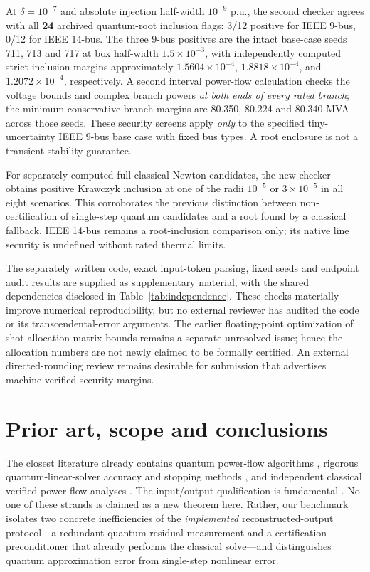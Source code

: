\documentclass[11pt,a4paper]{article}
\theoremstyle{remark}\newtheorem{remark}[theorem]{Remark}
\begin{document}
At $\delta=10^{-7}$ and absolute injection half-width $10^{-9}$ p.u., the second checker agrees with all \textbf{24} archived quantum-root inclusion flags: 3/12 positive for IEEE 9-bus, 0/12 for IEEE 14-bus. The three 9-bus positives are the intact base-case seeds 711, 713 and 717 at box half-width $1.5\times10^{-3}$, with independently computed strict inclusion margins approximately $1.5604\times10^{-4}$, $1.8818\times10^{-4}$, and $1.2072\times10^{-4}$, respectively. A second interval power-flow calculation checks the voltage bounds and complex branch powers \emph{at both ends of every rated branch}; the minimum conservative branch margins are 80.350, 80.224 and 80.340 MVA across those seeds. These security screens apply \emph{only} to the specified tiny-uncertainty IEEE 9-bus base case with fixed bus types. A root enclosure is not a transient stability guarantee.

For separately computed full classical Newton candidates, the new checker obtains positive Krawczyk inclusion at one of the radii $10^{-5}$ or $3\times10^{-5}$ in all eight scenarios. This corroborates the previous distinction between non-certification of single-step quantum candidates and a root found by a classical fallback. IEEE 14-bus remains a root-inclusion comparison only; its native line security is undefined without rated thermal limits.

The separately written code, exact input-token parsing, fixed seeds and endpoint audit results are supplied as supplementary material, with the shared dependencies disclosed in Table~\ref{tab:independence}. These checks materially improve numerical reproducibility, but no external reviewer has audited the code or its transcendental-error arguments. The earlier floating-point optimization of shot-allocation matrix bounds remains a separate unresolved issue; hence the allocation numbers are not newly claimed to be formally certified. An external directed-rounding review remains desirable for submission that advertises machine-verified security margins.

\section{Prior art, scope and conclusions}\label{sec:novelty}
The closest literature already contains quantum power-flow algorithms \citep{feng2021,feng2023,feng2025,ninlawat2026}, rigorous quantum-linear-solver accuracy and stopping methods \citep{bravo2023,li2026}, and independent classical verified power-flow analyses \citep{wang1992,pereira2012,krawczyk1969,neumaier1990,rump2010}. The input/output qualification is fundamental \citep{hhl2009,aaronson2015,pareek2026}. No one of these strands is claimed as a new theorem here. Rather, our benchmark isolates two concrete inefficiencies of the \emph{implemented} reconstructed-output protocol---a redundant quantum residual measurement and a certification preconditioner that already performs the classical solve---and distinguishes quantum approximation error from single-step nonlinear error.
\end{document}
